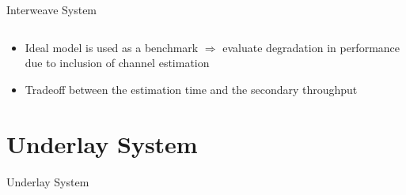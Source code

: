 \documentclass[16pt]{beamer}
\newcommand{\fs}[2]{\fontsize{#1 pt}{#2}\selectfont}
\begin{document}
\begin{frame}[t]{Interweave System}
\begin{columns}
\begin{column}{0.55\columnwidth}
\begin{center}
{
		}
	\end{center}
	\end{column}
	\end{columns}
	\begin{block}{}
		\fs{7}{8}
		\begin{itemize}
			\item Ideal model is used as a benchmark $\Rightarrow$ evaluate degradation in performance due to inclusion of channel estimation

			\item Tradeoff between the estimation time and the secondary throughput 
		\end{itemize}		
	\end{block}	
\end{frame}

\fi

\section{Underlay System}
\begin{frame}[c]{}
\begin{center}
Underlay System
\end{center}
\end{frame}
\end{document}
